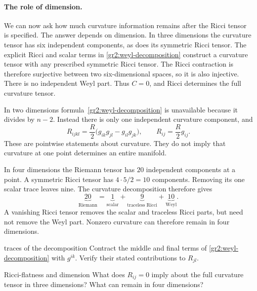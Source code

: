 \documentclass[11pt,a4paper]{article}
\numberwithin{equation}{section}
\begin{document}
\paragraph{The role of dimension.}
We can now ask how much curvature information remains after the Ricci
tensor is specified. The answer depends on dimension.
In three dimensions the curvature
tensor has six independent components, as does its symmetric Ricci
tensor. The explicit Ricci and scalar terms in
\eqref{gr2:weyl-decomposition} construct a curvature tensor with any
prescribed symmetric Ricci tensor. The Ricci contraction is therefore
surjective between two six-dimensional spaces, so it is also injective.
There is no independent Weyl part. Thus \(C=0\), and Ricci determines
the full curvature tensor.

In two dimensions formula~\eqref{gr2:weyl-decomposition}
is unavailable because it divides by \(n-2\). Instead there is only
one independent curvature component, and
\begin{equation}
 R_{ijkl}=\frac{R}{2}
   \bigl(g_{ik}g_{jl}-g_{il}g_{jk}\bigr),
 \qquad R_{ij}=\frac{R}{2}g_{ij}.
 \label{gr2:two-dimensional-curvature}
\end{equation}
These are pointwise statements about curvature. They do not imply
that curvature at one point determines an entire manifold.

In four dimensions the Riemann tensor has \(20\) independent
components at a point. A symmetric Ricci tensor has
\(4\cdot5/2=10\) components. Removing its one scalar trace leaves
nine. The curvature decomposition therefore gives
\[
 \underbrace{20}_{\text{Riemann}}
 =\underbrace{1}_{\text{scalar}}
  +\underbrace{9}_{\text{traceless Ricci}}
  +\underbrace{10}_{\text{Weyl}}.
\]
A vanishing Ricci tensor removes the scalar and traceless Ricci parts,
but need not remove the Weyl part. Nonzero curvature can therefore
remain in four dimensions.

\begin{studentwork}[2.7cm]{traces of the decomposition}
Contract the middle and final terms of
\eqref{gr2:weyl-decomposition} with \(g^{ik}\). Verify their stated
contributions to \(R_{jl}\).
\end{studentwork}

\begin{studentwork}[1.7cm]{Ricci-flatness and dimension}
What does \(R_{ij}=0\) imply about the full curvature tensor in three
dimensions? What can remain in four dimensions?
\end{studentwork}
\end{document}
